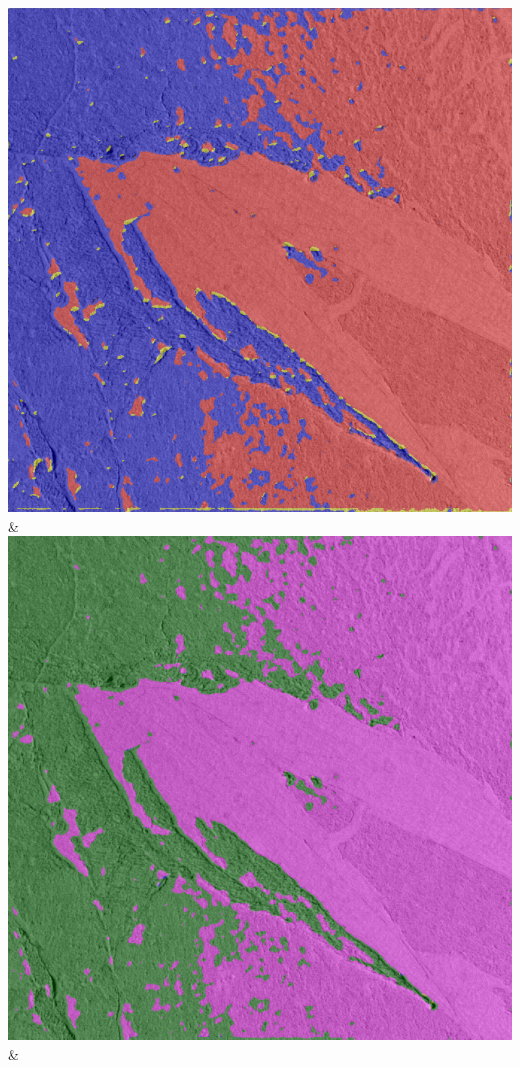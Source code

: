 \begin{table}[h!]
\begin{tabularx}{\textwidth}
		\includegraphics[width=0.9\linewidth]{images/gen/number_of_segments/p03_03.png_50.png} &
		\includegraphics[width=0.9\linewidth]{images/gen/number_of_segments/p03_03.png_75.png} &

\end{tabularx}
\end{table}
